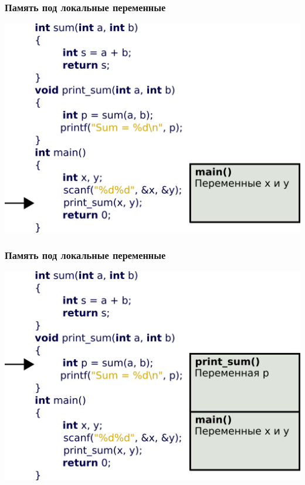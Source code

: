 \documentclass[12pt,pdf,hyperref={unicode}]{beamer}
\begin{document}
\begin{frame}[fragile]
\frametitle{Память под локальные переменные} 
\begin{center}
\includegraphics[width=\linewidth]{images/v_stack2.png}
\end{center}
\end{frame}

\begin{frame}[fragile]
\frametitle{Память под локальные переменные} 
\begin{center}
\includegraphics[width=\linewidth]{images/v_stack3.png}
\end{center}
\end{frame}
\end{document}
